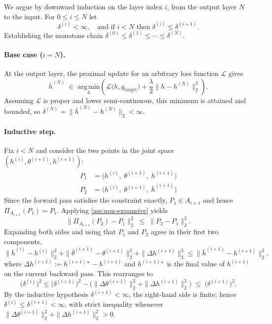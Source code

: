 We argue by downward induction on the layer index $i$, from the output layer $N$
to the input. For $0 \leq i \leq N$ let 
\[
     \delta^{(i)} < \infty,
    \quad\text{and if } i < N \text{ then } \delta^{(i)} \leq \delta^{(i+1)}.
\]
Establishing the monotone chain $\delta^{(0)} \leq \delta^{(1)} \leq \cdots \leq \delta^{(N)}$.

\paragraph{Base case ($i = N$).}
At the output layer, the proximal update for an arbitrary loss function
$\mathcal{L}$ gives
\[
\bar{h}^{(N)} \;\in\; \underset{h}{\mathrm{arg\,min}}
\left( \mathcal{L}\bigl(h, y_{\mathrm{target}}\bigr)
       + \frac{\lambda}{2} \bigl\|h - h^{(N)}\bigr\|_2^2 \right).
\]
Assuming $\mathcal{L}$ is proper and lower semi-continuous, this minimum is
attained and bounded, so $\delta^{(N)} = \|\bar{h}^{(N)} - h^{(N)}\|_2 < \infty$.

\paragraph{Inductive step.}
Fix $i < N$ and consider the two points in the joint space
$(h^{(i)}, \theta^{(i+1)}, h^{(i+1)})$:
\begin{align*}
P_1 &= \bigl(h^{(i)},\; \theta^{(i+1)},\; h^{(i+1)}\bigr)\\
P_2 &= \bigl(h^{(i)},\; \theta^{(i+1)},\; \bar{h}^{(i+1)}\bigr)
\end{align*}
Since the forward pass satisfies the constraint exactly, $P_1 \in A_{i+1}$ and
hence $\Pi_{A_{i+1}}(P_1) = P_1$. Applying \cref{ass:non-expansive} yields
\[
\|\Pi_{A_{i+1}}(P_2) - P_1\|_2^2 \;\leq\; \|P_2 - P_1\|_2^2 .
\]
Expanding both sides and using that $P_1$ and $P_2$ agree in their first two
components,
\[
\|\bar{h}^{(i)} - h^{(i)}\|_2^2 + \|\bar\theta^{(i+1)} - \theta^{(i+1)}\|_2^2
   + \|\Delta h^{(i+1)}\|_2^2
\leq
\|\bar{h}^{(i+1)} - h^{(i+1)}\|_2^2,
\]
where $\Delta h^{(i+1)} := h^{(i+1)\star} - h^{(i+1)}$ and $h^{(i+1)\star}$ is the
final value of $h^{(i+1)}$ on the current backward pass. This rearranges to
\[
\bigl(\delta^{(i)}\bigr)^2 \leq \bigl(\delta^{(i+1)}\bigr)^2
   - \bigl(\|\Delta \theta^{(i+1)}\|_2^2 + \|\Delta h^{(i+1)}\|_2^2\bigr)
\;\leq\; \bigl(\delta^{(i+1)}\bigr)^2 .
\]
By the inductive hypothesis $\delta^{(i+1)} < \infty$, the right-hand side is
finite; hence $\delta^{(i)} \leq \delta^{(i+1)} < \infty$, with strict inequality
whenever $\|\Delta \theta^{(i+1)}\|_2^2 + \|\Delta h^{(i+1)}\|_2^2 > 0$. 
